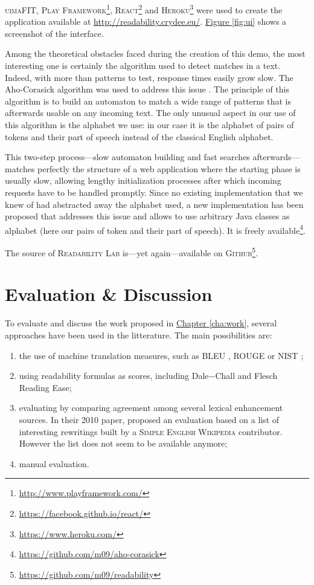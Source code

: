 \documentclass[a4paper, 11pt, onepage]{scrreprt}
\newcommand\sew{\textsc{Simple English Wikipedia}}
\newcommand\figureref[1]{\hyperref[#1]{Figure \ref*{#1}}}
\newcommand\chapterref[1]{\hyperref[#1]{Chapter \ref*{#1}}}
\begin{document}
\textsc{uimaFIT}, \textsc{Play
  Framework}\footnote{\url{http://www.playframework.com/}},
\textsc{React}\footnote{\url{https://facebook.github.io/react/}} and
\textsc{Heroku}\footnote{\url{https://www.heroku.com/}} were used to
create the application available at
\url{http://readability.crydee.eu/}. \figureref{fig:ui} shows a
screenshot of the interface.

Among the theoretical obstacles faced during the creation of this
demo, the most interesting one is certainly the algorithm used to
detect matches in a text. Indeed, with more than 
patterns to test, response times easily grow slow. The Aho-Corasick
algorithm was used to address this issue \cite{aho1975efficient}. The
principle of this algorithm is to build an automaton to match a wide
range of patterns that is afterwards usable on any incoming text. The
only unusual aspect in our use of this algorithm is the alphabet we
use: in our case it is the alphabet of pairs of tokens and their part
of speech instead of the classical English alphabet.

This two-step process—slow automaton building and fast searches
afterwards—matches perfectly the structure of a web application where
the starting phase is usually slow, allowing lengthy initialization
processes after which incoming requests have to be handled
promptly. Since no existing implementation that we knew of had
abstracted away the alphabet used, a new implementation has been
proposed that addresses this issue and allows to use arbitrary Java
classes as alphabet (here our pairs of token and their part of
speech). It is freely
available\footnote{\url{https://github.com/m09/aho-corasick}}.

The source of \textsc{Readability Lab} is—yet again—available on
\textsc{Github}\footnote{\url{https://github.com/m09/readability}}.

\chapter{Evaluation \& Discussion}
\label{cha:discussion}

To evaluate and discuss the work proposed in \chapterref{cha:work},
several approaches have been used in the litterature. The main
possibilities are:

\begin{enumerate}
\item the use of machine translation measures, such as BLEU
  \cite{papineni2002bleu}, ROUGE \cite{lin2004rouge} or NIST
  \cite{doddington2002automatic};
\item using readability formulas as scores, including Dale−Chall and
  Flesch Reading Ease;
\item evaluating by comparing agreement among several lexical
  enhancement sources. In their 2010 paper, \cite{yatskar2010sake}
  proposed an evaluation based on a list of interesting rewritings
  built by a \sew{} contributor. However the list does not seem to be
  available anymore;
\item manual evaluation.
\end{enumerate}
\end{document}
